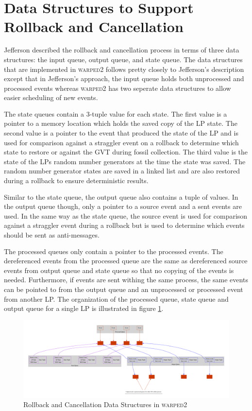 \documentclass[11pt]{book}
\begin{document}
\section{Data Structures to Support Rollback and Cancellation}

Jefferson\cite{jefferson-85} described the rollback and cancellation process in terms of three
data structures: the input queue, output queue, and state queue. The data structures that are
implemented in \textsc{warped2} follows pretty closely to Jefferson's description except that
in Jefferson's approach, the input queue holds both unprocessed and processed events whereas
\textsc{warped2} has two seperate data structures to allow easier scheduling of new events.

The state queues contain a 3-tuple value for each state. The first value is a pointer to a
memory location which holds the saved copy of the LP state. The second value is a pointer to the
event that produced the state of the LP and is used for comparison against a straggler event
on a rollback to determine which state to restore or against the GVT during fossil collection.
The third value is the state of the LPs random number generators at the time the state was saved.
The random number generator states are saved in a linked list and are also restored during a
rollback to ensure deterministic results.

Similar to the state queue, the output queue also contains a tuple of values. In the output
queue though, only a pointer to a source event and a sent events are used. In the same way
as the state queue, the source event is used for comparison against a straggler event during
a rollback but is used to determine which events should be sent as anti-messages.

The processed queues only contain a pointer to the processed events. The dereferenced events
from the processed queue are the same as dereferenced source events from output queue and state
queue so that no copying of the events is needed. Furthermore, if events are sent withing the
same process, the same events can be pointed to from the output queue and an unprocessed or
processed event from another LP. The organization of the processed queue, state queue and output
queue for a single LP is illustrated in figure \ref{rollback_ds}.

\begin{figure}[H]
    \centering
    \includegraphics[width=\textwidth]{figs/graphviz/rollback_ds.pdf}
    \caption{Rollback and Cancellation Data Structures in \textsc{warped2}}\label{rollback_ds}
\end{figure}
\end{document}

